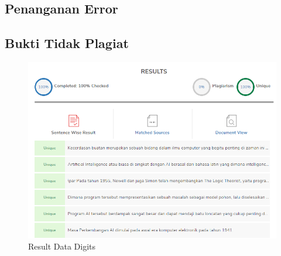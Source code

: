 \subsection{Penanganan Error}

\subsection{Bukti Tidak Plagiat}
	\begin{figure}[H]
		\centering
		\includegraphics[width=1\textwidth]{figures/1174057/chapter1/plagiat.png}
		\caption{Result Data Digits}
		\label{print}
	\end{figure}